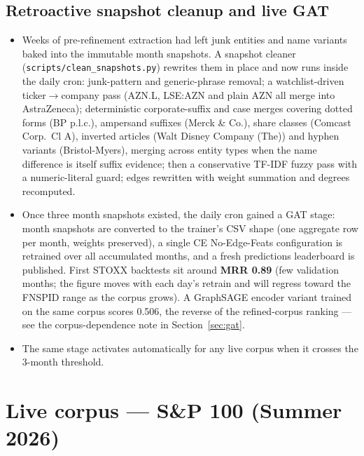 \documentclass[11pt]{article}
\begin{document}
\subsection{Retroactive snapshot cleanup and live GAT}
\begin{itemize}
  \item Weeks of pre-refinement extraction had left junk entities and name variants baked into the immutable month snapshots. A snapshot cleaner (\texttt{scripts/clean\_snapshots.py}) rewrites them in place and now runs inside the daily cron: junk-pattern and generic-phrase removal; a watchlist-driven ticker\(\to\)company pass (AZN.L, LSE:AZN and plain AZN all merge into AstraZeneca); deterministic corporate-suffix and case merges covering dotted forms (BP p.l.c.), ampersand suffixes (Merck \& Co.), share classes (Comcast Corp.\ Cl A), inverted articles (Walt Disney Company (The)) and hyphen variants (Bristol-Myers), merging across entity types when the name difference is itself suffix evidence; then a conservative TF-IDF fuzzy pass with a numeric-literal guard; edges rewritten with weight summation and degrees recomputed.
  \item Once three month snapshots existed, the daily cron gained a GAT stage: month snapshots are converted to the trainer's CSV shape (one aggregate row per month, weights preserved), a single CE No-Edge-Feats configuration is retrained over all accumulated months, and a fresh predictions leaderboard is published. First STOXX backtests sit around \textbf{MRR 0.89} (few validation months; the figure moves with each day's retrain and will regress toward the FNSPID range as the corpus grows). A GraphSAGE encoder variant trained on the same corpus scores 0.506, the reverse of the refined-corpus ranking --- see the corpus-dependence note in Section~\ref{sec:gat}.
  \item The same stage activates automatically for any live corpus when it crosses the 3-month threshold.
\end{itemize}

\section{Live corpus --- S\&P 100 (Summer 2026)}
\label{sec:sp100}
\end{document}
